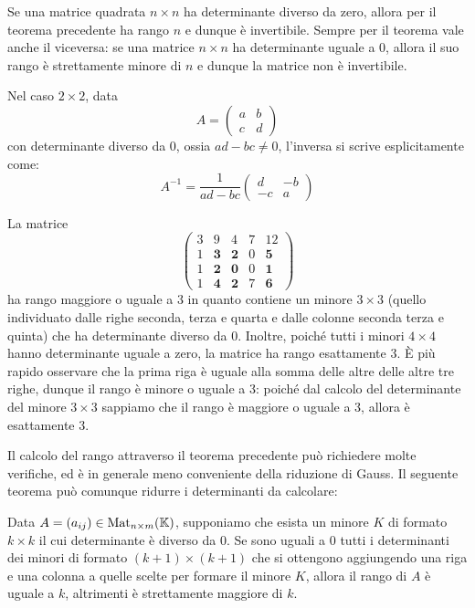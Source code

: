 \begin{observation}
	Se una matrice quadrata $n \times n$ ha determinante diverso da zero, allora
	per il teorema precedente ha rango $n$ e dunque è invertibile. Sempre per il
	teorema vale anche il viceversa: se una matrice $n \times n$ ha determinante
	uguale a 0, allora il suo rango è strettamente minore di $n$ e dunque la
	matrice non è invertibile.

	Nel caso $2 \times 2$, data
	\[
		A = \begin{pmatrix}
			a & b \\
			c & d
		\end{pmatrix}
	\]
	con determinante diverso da 0, ossia $ad - bc \neq 0$, l'inversa si scrive
	esplicitamente come:
	\[
		A^{-1} = \frac{1}{ad - bc} \begin{pmatrix}
			d  & -b \\
			-c & a
		\end{pmatrix}
	\]
\end{observation}

\begin{example}
	La matrice
	\[
		\begin{pmatrix}
			3 & 9          & 4          & 7 & 12         \\
			1 & \textbf{3} & \textbf{2} & 0 & \textbf{5} \\
			1 & \textbf{2} & \textbf{0} & 0 & \textbf{1} \\
			1 & \textbf{4} & \textbf{2} & 7 & \textbf{6}
		\end{pmatrix}
	\]
	ha rango maggiore o uguale a 3 in quanto contiene un minore $3 \times 3$
	(quello individuato dalle righe seconda, terza e quarta e dalle colonne
	seconda terza e quinta) che ha determinante diverso da 0. Inoltre, poiché
	tutti i minori $4 \times 4$ hanno determinante uguale a zero, la matrice ha
	rango esattamente 3. È più rapido osservare che la prima riga è uguale
	alla somma delle altre delle altre tre righe, dunque il rango è minore o
	uguale a 3: poiché dal calcolo del determinante del minore $3 \times 3$
	sappiamo che il rango è maggiore o uguale a 3, allora è esattamente 3.
\end{example}

Il calcolo del rango attraverso il teorema precedente può richiedere molte
verifiche, ed è in generale meno conveniente della riduzione di Gauss. Il
seguente teorema può comunque ridurre i determinanti da calcolare:

\begin{theorem}
	Data $A = (a_{ij}) \in \operatorname{Mat}_{n \times m}(\mathbb{K})$, supponiamo che esista un minore $K$ di formato $k \times k$
	il cui determinante è diverso da 0. Se sono uguali a 0 tutti i determinanti dei minori di formato
	$(k + 1) \times (k + 1)$ che si ottengono aggiungendo una riga e una colonna a quelle scelte per formare il
	minore $K$, allora il rango di $A$ è uguale a $k$, altrimenti è strettamente maggiore di $k$.
\end{theorem}

